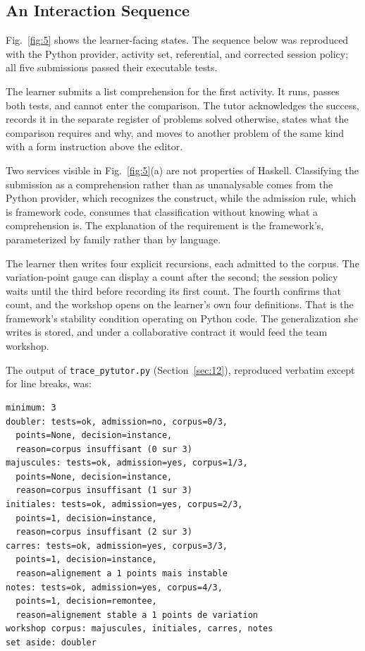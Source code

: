 \documentclass[journal]{IEEEtran}
\begin{document}
\subsection{An Interaction Sequence}\label{sec:5.5}
Fig.~\ref{fig:5} shows the learner-facing states. The sequence below was reproduced
with the Python provider, activity set, referential, and corrected session
policy; all five submissions passed their executable tests.

The learner submits a list comprehension for the first activity. It
runs, passes both tests, and cannot enter the comparison. The tutor
acknowledges the success, records it in the separate register of
problems solved otherwise, states what the comparison requires and why,
and moves to another problem of the same kind with a form instruction
above the editor.

Two services visible in Fig.~\ref{fig:5}(a) are not properties of Haskell.
Classifying the submission as a comprehension rather than as
unanalysable comes from the Python provider, which recognizes the
construct, while the admission rule, which is framework code, consumes
that classification without knowing what a comprehension is. The
explanation of the requirement is the framework's, parameterized by
family rather than by language.

The learner then writes four explicit recursions, each admitted to the
corpus. The variation-point gauge can display a count after the second;
the session policy waits until the third before recording its first
count. The fourth confirms that count, and the workshop opens on the
learner's own four definitions. That is the framework's stability
condition operating on Python code. The
generalization she writes is stored, and under a collaborative contract
it would feed the team workshop.

The output of \texttt{trace\_pytutor.py} (Section~\ref{sec:12}), reproduced verbatim
except for line breaks, was:
\begin{samepage}\noindent\begin{minipage}{\linewidth}
\begin{verbatim}
minimum: 3
doubler: tests=ok, admission=no, corpus=0/3,
  points=None, decision=instance,
  reason=corpus insuffisant (0 sur 3)
majuscules: tests=ok, admission=yes, corpus=1/3,
  points=None, decision=instance,
  reason=corpus insuffisant (1 sur 3)
initiales: tests=ok, admission=yes, corpus=2/3,
  points=1, decision=instance,
  reason=corpus insuffisant (2 sur 3)
carres: tests=ok, admission=yes, corpus=3/3,
  points=1, decision=instance,
  reason=alignement a 1 points mais instable
notes: tests=ok, admission=yes, corpus=4/3,
  points=1, decision=remontee,
  reason=alignement stable a 1 points de variation
workshop corpus: majuscules, initiales, carres, notes
set aside: doubler
\end{verbatim}
\end{minipage}\end{samepage}
\end{document}
